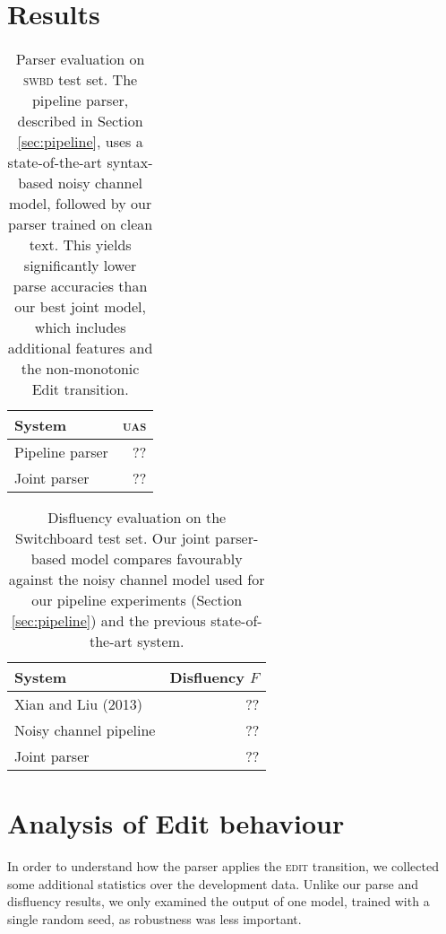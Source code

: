 \documentclass[11pt,letterpaper]{article}
\newcommand{\edittrans}{\textsc{edit}\xspace}
\begin{document}
\section{Results}
\label{sec:results}

\begin{table}
\centering
\begin{tabular}{l|r}
    System          & \textsc{uas} \\
    \hline \hline
    Pipeline parser & ?? \\
    Joint parser    & ?? \\
    \hline
\end{tabular}
\caption{Parser evaluation on \textsc{swbd} test set. The pipeline parser, described
    in Section \ref{sec:pipeline}, uses a state-of-the-art syntax-based noisy
    channel model, followed by our parser trained on clean text. This yields
    significantly lower parse accuracies than our best joint model, which includes
additional features and the non-monotonic Edit transition.\label{tab:parseval}}
\end{table}

\begin{table}
    \centering
    \begin{tabular}{l|r}
        System                      & Disfluency $F$ \\
        \hline \hline
        Xian and Liu (2013)         & ?? \\
        Noisy channel pipeline      & ?? \\
        Joint parser                & ?? \\
        \hline
    \end{tabular}
    \caption{Disfluency evaluation on the Switchboard test set. Our joint parser-based
             model compares favourably 
             against the noisy channel model used for our pipeline experiments
             (Section \ref{sec:pipeline}) and the previous state-of-the-art system.
         \label{tab:dfl_eval}}
\end{table}

\section{Analysis of Edit behaviour}

In order to understand how the parser applies the \edittrans transition, we
collected some additional statistics over the development data.  Unlike our
parse and disfluency results, we only examined the output of one model, trained
with a single random seed, as robustness was less important.
\end{document}
